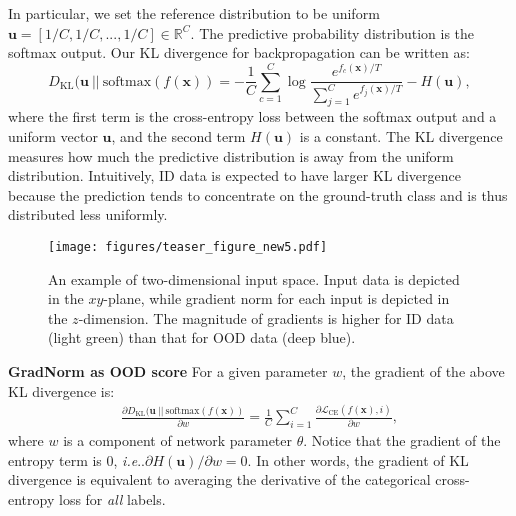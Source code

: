 \documentclass{article}
\makeatletter
\def\*#1{\mathbf{#1}}
\DeclareRobustCommand\onedot{\futurelet\@let@token\@onedot}
\def\@onedot{\ifx\@let@token.\else.\null\fi\xspace}
\def\ie{\emph{i.e}\onedot} \def\Ie{\emph{I.e}\onedot}
\makeatother
\begin{document}
In particular, we set the reference distribution to be uniform $\*u= [1/C, 1/C,...,1/C] \in \mathbb{R}^C$. The predictive probability distribution is the softmax output. Our KL divergence for backpropagation can be written as:
\vspace{-0.2cm}
\begin{equation}
\label{eq:kl}
    D_\text{KL}(\*u~||~\text{softmax}(f(\*x))  = - \frac{1}{C}\sum_{c=1}^C \log{ \frac{e^{{f_c(\*x)} / T}}{\sum_{j=1}^C e^{{f_{j}(\*x)} / T}}} - H(\*u),
\end{equation}
where the first term is the cross-entropy loss between the softmax output and a uniform vector $\*u$, and the second term $H(\*u)$ is a constant. The KL divergence measures how much the predictive distribution is away from the uniform distribution. Intuitively, ID data is expected to have larger KL divergence because the prediction tends to concentrate on the ground-truth class and is thus distributed less uniformly. 



\begin{wrapfigure}{r}{0.45\textwidth}
\vspace{-1cm}
    \texttt{[image: figures/teaser\_figure\_new5.pdf]}
        \vspace{-0.5cm}
    \caption{\small{An example of two-dimensional input space. Input data is depicted in the $xy$-plane, while gradient norm for each input is depicted in the $z$-dimension. The magnitude of gradients is higher for ID data ({\color{green}light green}) than that for OOD data ({\color{blue}deep blue}).}}
    \label{fig:teaser}
    \vspace{-1.5cm}
\end{wrapfigure}
\textbf{{GradNorm} as OOD score} For a given parameter $w$, the gradient of the above KL divergence is:
\begin{align}
    \frac{\partial D_\text{KL}(\*u~||~\text{softmax}(f(\*x))}{\partial w} = \frac{1}{C}\sum_{i=1}^C \frac{\partial \mathcal{L}_\text{CE}(f(\*x),i)}{\partial w},
\end{align}
where $w$ is a component of network parameter $\theta$. Notice that the gradient of the entropy term is $0$, \ie $\partial H(\*u) / \partial w=0$. In other words, the gradient of KL divergence is equivalent to averaging the derivative of the categorical cross-entropy loss for \emph{all} labels.
\end{document}
